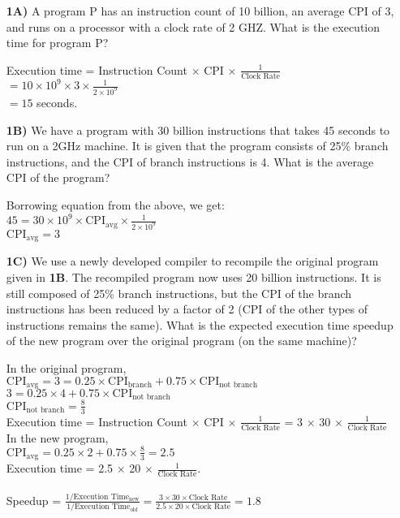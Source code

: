 \documentclass{article}
\begin{document}
\begin{enumerate}
    \item [\textbf{1A)}] A program P has an instruction count of 10 billion, an average CPI of 3, and runs on a processor with a clock rate of 2 GHZ. What is the execution time for program P? \\
    \noindent\fbox
    {%
        \parbox{\linewidth}
        {%
            Execution time = Instruction Count $\times$ CPI $\times$ $\frac{1}{\text{Clock Rate}}$ \\
            $= 10 \times 10^{9} \times 3 \times \frac{1}{2 \times 10^{9}}$\\
            $=15$ seconds. 
        }%
    }
    \item [\textbf{1B)}] We have a program with 30 billion instructions that takes 45 seconds to run on a 2GHz machine. It is given that the program consists of 25\% branch instructions, and the CPI of branch instructions is 4. What is the average CPI of the program?\\
    \noindent\fbox
    {%
        \parbox{\linewidth}
        {%
            Borrowing equation from the above, we get:\\
            $45 = 30 \times 10^{9} \times \text{CPI}_{\text{avg}} \times \frac{1}{2 \times 10^{9}}$ \\
            $\text{CPI}_{\text{avg}} = 3$
        }%
    }
    \item [\textbf{1C)}] We use a newly developed compiler to recompile the original program given in \textbf{1B}. The recompiled program now uses 20 billion instructions. It is still composed of 25\% branch instructions, but the CPI of the branch instructions has been reduced by a factor of 2 (CPI of the other types of instructions remains the same). What is the expected execution time speedup of the new program over the original program (on the same machine)?\\
    \noindent\fbox
    {%
        \parbox{\linewidth}
        {%
            In the original program, \\
            $\text{CPI}_{\text{avg}} = 3 = 0.25 \times \text{CPI}_{\text{branch}} + 0.75 \times \text{CPI}_{\text{not branch}}$\\
            $3 = 0.25 \times 4 + 0.75 \times \text{CPI}_{\text{not branch}}$\\
            $\text{CPI}_{\text{not branch}} = \frac{8}{3}$\\
            Execution time = Instruction Count $\times$ CPI $\times$ $\frac{1}{\text{Clock Rate}}$  = 3 $\times$ 30 $\times$ $\frac{1}{\text{Clock Rate}}$ \\
            In the new program, \\
            $\text{CPI}_{\text{avg}} = 0.25 \times 2 + 0.75 \times \frac{8}{3} = 2.5$\\
            Execution time = 2.5 $\times$ 20 $\times$ $\frac{1}{\text{Clock Rate}}$.\\\\
            Speedup = $\frac{1 / \text{Execution Time}_{\text{new}}}{1 / \text{Execution Time}_{\text{old}}} = \frac{3 \times 30 \times \text{Clock Rate}}{2.5 \times 20 \times \text{Clock Rate}} = 1.8$\\
            
}}
\end{enumerate}
\end{document}
